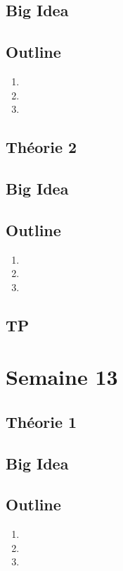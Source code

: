 \documentclass{article}
\begin{document}
\subsection*{Big Idea}
\subsection*{Outline}
    \begin{enumerate}
    \item
    \item
    \item
    \end{enumerate}
\subsection{Théorie 2}
\subsection*{Big Idea}
\subsection*{Outline}
    \begin{enumerate}
    \item
    \item
    \item
    \end{enumerate}
\subsection{TP}

\pagebreak
\section{Semaine 13}
\subsection{Théorie 1}
\subsection*{Big Idea}
\subsection*{Outline}
    \begin{enumerate}
    \item
    \item
    \item
    \end{enumerate}
\end{document}
